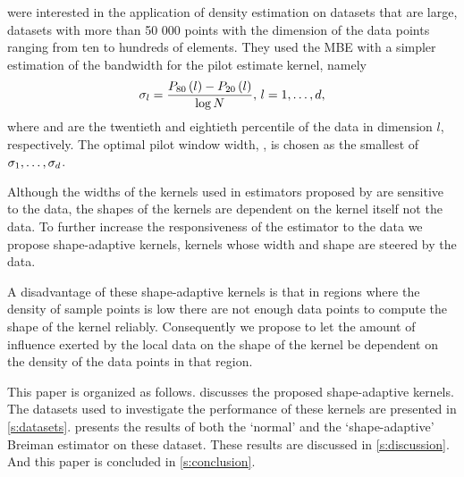 	\textcite{ferdosi2011comparison} were interested in the application of density estimation on datasets that are large, \ie datasets with more than 50 000 points with the dimension of the data points ranging from ten to hundreds of elements. They used the MBE with a simpler estimation of the bandwidth for the pilot estimate kernel, namely 
		\begin{equation}
			\sigma_l = \frac{P_{80}\left( l \right) - P_{20}\left( l \right)}{\log N}, \, l = 1, \dotsc, d,
		\end{equation}
	where  and  are the twentieth and eightieth percentile of the data in dimension $l$, respectively. 
	The optimal pilot window width, \varBandwidth, is chosen as the smallest of $\sigma_1, \dotsc, \sigma_d$.

	Although the widths of the kernels used in estimators proposed by \citeauthor{breiman1977variable,wilkinson1995dataplot} are sensitive to the data, the shapes of the kernels are dependent on the kernel itself not the data. To further increase the responsiveness of the estimator to the data we propose shape-adaptive kernels, kernels whose width and shape are steered by the data. 

	A disadvantage of these shape-adaptive kernels is that in regions where the density of sample points is low there are not enough data points to compute the shape of the kernel reliably. Consequently we propose to let the amount of influence exerted by the local data on the shape of the kernel be dependent on the density of the data points in that region.

	This paper is organized as follows.  discusses the proposed shape-adaptive kernels. The datasets used to investigate the performance of these kernels are presented in \cref{s:datasets}.  presents the results of both the `normal' and the `shape-adaptive' Breiman estimator on these dataset. These results are discussed in \cref{s:discussion}. And this paper is concluded in \cref{s:conclusion}.